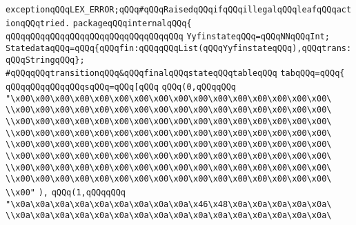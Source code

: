 \verb|exceptionqQQqLEX_ERROR;qQQq#qQQqRaisedqQQqifqQQqillegalqQQqleafqQQqactionqQQqtried.|\newline
\verb|packageqQQqinternalqQQq{|\newline
\verb|qQQqqQQqqQQqqQQqqQQqqQQqqQQqqQQqqQQq|\newline
\newline
\verb|YyfinstateqQQq=qQQqNNqQQqInt;|\newline
\verb|StatedataqQQq=qQQq{qQQqfin:qQQqqQQqList(qQQqYyfinstateqQQq),qQQqtrans:qQQqStringqQQq};|\newline
\verb|#qQQqqQQqtransitionqQQq&qQQqfinalqQQqstateqQQqtableqQQq|\newline
\verb|tabqQQq=qQQq{|\newline
\verb|qQQqqQQqqQQqqQQqsqQQq=qQQq[qQQq|\newline
\verb|qQQq(0,qQQqqQQq|\newline
\verb|"\x00\x00\x00\x00\x00\x00\x00\x00\x00\x00\x00\x00\x00\x00\x00\x00\|\newline
\verb|\\x00\x00\x00\x00\x00\x00\x00\x00\x00\x00\x00\x00\x00\x00\x00\x00\|\newline
\verb|\\x00\x00\x00\x00\x00\x00\x00\x00\x00\x00\x00\x00\x00\x00\x00\x00\|\newline
\verb|\\x00\x00\x00\x00\x00\x00\x00\x00\x00\x00\x00\x00\x00\x00\x00\x00\|\newline
\verb|\\x00\x00\x00\x00\x00\x00\x00\x00\x00\x00\x00\x00\x00\x00\x00\x00\|\newline
\verb|\\x00\x00\x00\x00\x00\x00\x00\x00\x00\x00\x00\x00\x00\x00\x00\x00\|\newline
\verb|\\x00\x00\x00\x00\x00\x00\x00\x00\x00\x00\x00\x00\x00\x00\x00\x00\|\newline
\verb|\\x00\x00\x00\x00\x00\x00\x00\x00\x00\x00\x00\x00\x00\x00\x00\x00\|\newline
\verb|\\x00"|\newline
\verb|),|\newline
\verb|qQQq(1,qQQqqQQq|\newline
\verb|"\x0a\x0a\x0a\x0a\x0a\x0a\x0a\x0a\x0a\x46\x48\x0a\x0a\x0a\x0a\x0a\|\newline
\verb|\\x0a\x0a\x0a\x0a\x0a\x0a\x0a\x0a\x0a\x0a\x0a\x0a\x0a\x0a\x0a\x0a\|\newline
